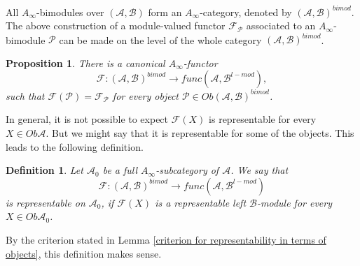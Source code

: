 \documentclass{amsart}
\newtheorem{definition}[theorem]{Definition}
\newtheorem{proposition}[theorem]{Proposition}
\numberwithin{equation}{section}
\numberwithin{figure}{section}
\begin{document}
	All $A_{\infty}$-bimodules over $(\mathcal{A}, \mathcal{B})$ form an $A_{\infty}$-category, denoted by $(\mathcal{A}, \mathcal{B})^{bimod}$. The above construction of a module-valued functor $\mathcal{F}_{\mathcal{P}}$ associated to an $A_{\infty}$-bimodule $\mathcal{P}$ can be made on the level of the whole category $(\mathcal{A}, \mathcal{B})^{bimod}$. \par

\begin{proposition}
	There is a canonical $A_{\infty}$-functor
\begin{equation}
\mathcal{F}: (\mathcal{A}, \mathcal{B})^{bimod} \to func(\mathcal{A}, \mathcal{B}^{l-mod}),
\end{equation}
such that $\mathcal{F}(\mathcal{P}) = \mathcal{F}_{\mathcal{P}}$ for every object $\mathcal{P} \in Ob(\mathcal{A}, \mathcal{B})^{bimod}$.
\end{proposition}

	In general, it is not possible to expect $\mathcal{F}(X)$ is representable for every $X \in Ob\mathcal{A}$. But we might say that it is representable for some of the objects. This leads to the following definition. \par

\begin{definition}\label{definition of representability over a subcategory}
	Let $\mathcal{A}_{0}$ be a full $A_{\infty}$-subcategory of $\mathcal{A}$. We say that 
\begin{equation*}
\mathcal{F}: (\mathcal{A}, \mathcal{B})^{bimod} \to func(\mathcal{A}, \mathcal{B}^{l-mod})
\end{equation*}
is representable on $\mathcal{A}_{0}$, if $\mathcal{F}(X)$ is a representable left $\mathcal{B}$-module for every $X \in Ob\mathcal{A}_{0}$.
\end{definition}

	By the criterion stated in Lemma \ref{criterion for representability in terms of objects}, this definition makes sense. \par

\end{document}
